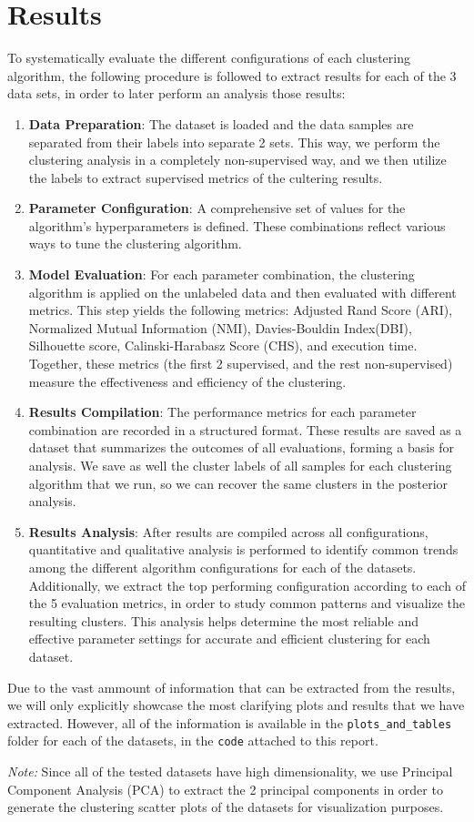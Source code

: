 \section{Results}\label{sec:results}
To systematically evaluate the different configurations of each clustering algorithm, the following procedure is followed to extract results for each of the 3 data sets, in order to later perform an analysis those results:

\begin{enumerate}
    \item \textbf{Data Preparation}: The dataset is loaded and the data samples are separated from their labels into separate 2 sets. This way, we perform the clustering analysis in a completely non-supervised way, and we then utilize the labels to extract supervised metrics of the cultering results.

    \item \textbf{Parameter Configuration}: A comprehensive set of values for the algorithm's hyperparameters is defined. These combinations reflect various ways to tune the clustering algorithm.

    \item \textbf{Model Evaluation}: For each parameter combination, the clustering algorithm is applied on the unlabeled data and then evaluated with different metrics. This step yields the following metrics: Adjusted Rand Score (ARI), Normalized Mutual Information (NMI), Davies-Bouldin Index(DBI), Silhouette score, Calinski-Harabasz Score (CHS), and execution time. Together, these metrics (the first 2 supervised, and the rest non-supervised) measure the effectiveness and efficiency of the clustering.

    \item \textbf{Results Compilation}: The performance metrics for each parameter combination are recorded in a structured format. These results are saved as a dataset that summarizes the outcomes of all evaluations, forming a basis for analysis. We save as well the cluster labels of all samples for each clustering algorithm that we run, so we can recover the same clusters in the posterior analysis.

    \item \textbf{Results Analysis}: After results are compiled across all configurations, quantitative and qualitative analysis is performed to identify common trends among the different algorithm configurations for each of the datasets. Additionally, we extract the top performing configuration according to each of the 5 evaluation metrics, in order to study common patterns and visualize the resulting clusters. This analysis helps determine the most reliable and effective parameter settings for accurate and efficient clustering for each dataset.
\end{enumerate}
Due to the vast ammount of information that can be extracted from the results, we will only explicitly showcase the most clarifying plots and results that we have extracted. However, all of the information is available in the \texttt{plots\_and\_tables} folder for each of the datasets, in the \texttt{code} attached to this report.

\textit{Note:} Since all of the tested datasets have high dimensionality, we use Principal Component Analysis (PCA) to extract the 2 principal components in order to generate the clustering scatter plots of the datasets for visualization purposes.


